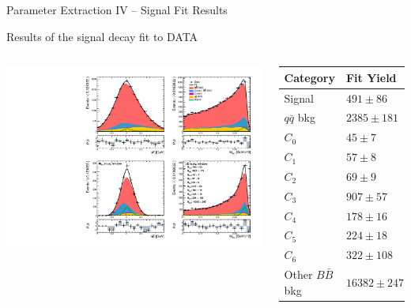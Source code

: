 \documentclass[serif]{beamer}
\begin{document}
\begin{frame}[t]{Parameter Extraction IV -- Signal Fit Results}
\vspace{-3mm}
\small

Results of the signal decay fit to DATA
\begin{columns}
	\vspace{-2mm}
	\begin{center}
		\includegraphics[width=\textwidth]{fig/sig_fit_data}
	\end{center}
	
	\begin{table}[H]
		\centering
		\begin{tabular}{l|l}
			Category & Fit Yield \\
			\toprule
			Signal & $491 \pm 86$ \\
			$q \bar q$ bkg & $ 2385 \pm 181 $ \\
			$C_0$ & $ 45 \pm 7 $ \\
			$C_1$ & $ 57 \pm 8 $\\
			$C_2$ & $ 69 \pm 9 $ \\
			$C_3$ & $ 907 \pm 57 $ \\
			$C_4$ & $ 178 \pm 16 $ \\
			$C_5$ & $ 224 \pm 18 $ \\
			$C_6$ & $ 322 \pm 108 $ \\
			Other $B \bar B$ bkg & $ 16382 \pm 247 $ \\
			\bottomrule
		\end{tabular}
	\end{table}
\end{columns}


\end{frame}
\end{document}
